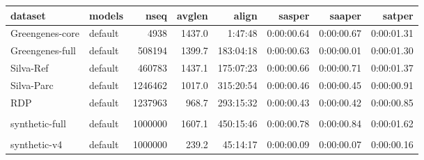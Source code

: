 \begin{table}
\begin{center}
  \scriptsize
  \begin{tabular}{llrr|rrrr} \hline
dataset         & models   &    nseq & avglen &     align &       sasper &       saaper &       satper \\ \hline
Greengenes-core & default  &    4938 & 1437.0 &   1:47:48 &   0:00:00.64 &   0:00:00.67 &   0:00:01.31 \\
Greengenes-full & default  &  508194 & 1399.7 & 183:04:18 &   0:00:00.63 &   0:00:00.01 &   0:00:01.30 \\
Silva-Ref       & default  &  460783 & 1437.1 & 175:07:23 &   0:00:00.66 &   0:00:00.71 &   0:00:01.37 \\
Silva-Parc      & default  & 1246462 & 1017.0 & 315:20:54 &   0:00:00.46 &   0:00:00.45 &   0:00:00.91 \\
RDP             & default  & 1237963 &  968.7 & 293:15:32 &   0:00:00.43 &   0:00:00.42 &   0:00:00.85 \\
& & & & & & & \\
synthetic-full  & default  & 1000000 & 1607.1 & 450:15:46 &   0:00:00.78 &   0:00:00.84 &   0:00:01.62 \\
& & & & & & & \\
synthetic-v4    & default  & 1000000 &  239.2 &  45:14:17 &   0:00:00.09 &   0:00:00.07 &   0:00:00.16 \\

\end{tabular}
\end{center}
\end{table}
